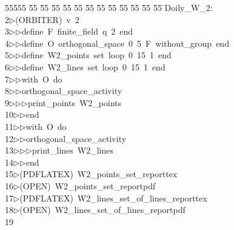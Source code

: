 %
%
\begin{tabbing}
55555 \= 55 \= 55 \= 55 \= 55 \= 55 \= 55 \= 55 \= 55 \= 55 \= 55 \= 55 \= 55 \= \>Doily\_W\_2:\\[0pt]
2\>$\triangleright$\>(ORBITER)\ v\ 2\ \\[0pt]
3\>$\triangleright$\>$\triangleright$\>define\ F\ finite\_field\ q\ 2\ end\ \\[0pt]
4\>$\triangleright$\>$\triangleright$\>define\ O\ orthogonal\_space\ 0\ 5\ F\ without\_group\ end\ \\[0pt]
5\>$\triangleright$\>$\triangleright$\>define\ W2\_points\ set\ loop\ 0\ 15\ 1\ end\ \\[0pt]
6\>$\triangleright$\>$\triangleright$\>define\ W2\_lines\ set\ loop\ 0\ 15\ 1\ end\ \\[0pt]
7\>$\triangleright$\>$\triangleright$\>with\ O\ do\ \\[0pt]
8\>$\triangleright$\>$\triangleright$\>orthogonal\_space\_activity\ \\[0pt]
9\>$\triangleright$\>$\triangleright$\>$\triangleright$\>print\_points\ W2\_points\ \\[0pt]
10\>$\triangleright$\>$\triangleright$\>end\ \\[0pt]
11\>$\triangleright$\>$\triangleright$\>with\ O\ do\ \\[0pt]
12\>$\triangleright$\>$\triangleright$\>orthogonal\_space\_activity\ \\[0pt]
13\>$\triangleright$\>$\triangleright$\>$\triangleright$\>print\_lines\ W2\_lines\ \\[0pt]
14\>$\triangleright$\>$\triangleright$\>end\\[0pt]
15\>$\triangleright$\>(PDFLATEX)\ W2\_points\_set\_reporttex\\[0pt]
16\>$\triangleright$\>(OPEN)\ W2\_points\_set\_reportpdf\\[0pt]
17\>$\triangleright$\>(PDFLATEX)\ W2\_lines\_set\_of\_lines\_reporttex\\[0pt]
18\>$\triangleright$\>(OPEN)\ W2\_lines\_set\_of\_lines\_reportpdf\\[0pt]
19\>\end{tabbing}
